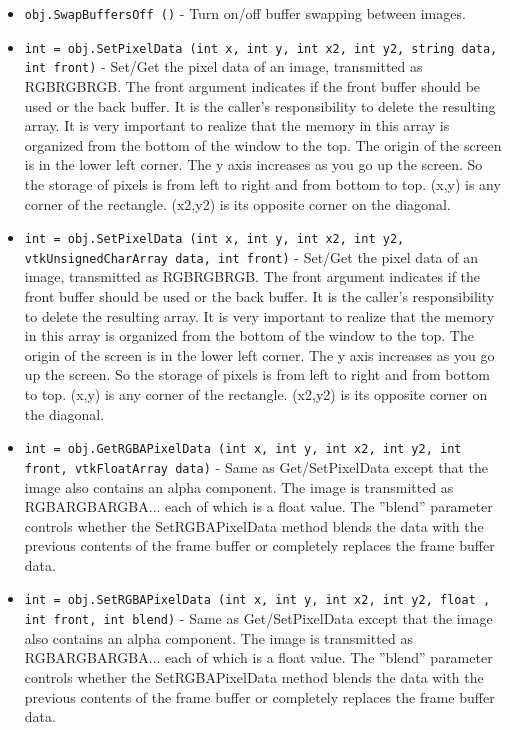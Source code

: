 \begin{itemize}
\item  \verb|obj.SwapBuffersOff ()| -  Turn on/off buffer swapping between images.

\item  \verb|int = obj.SetPixelData (int x, int y, int x2, int y2, string data, int front)| -  Set/Get the pixel data of an image, transmitted as RGBRGBRGB. The
 front argument indicates if the front buffer should be used or the back
 buffer. It is the caller's responsibility to delete the resulting
 array. It is very important to realize that the memory in this array
 is organized from the bottom of the window to the top. The origin
 of the screen is in the lower left corner. The y axis increases as
 you go up the screen. So the storage of pixels is from left to right
 and from bottom to top.
 (x,y) is any corner of the rectangle. (x2,y2) is its opposite corner on
 the diagonal.

\item  \verb|int = obj.SetPixelData (int x, int y, int x2, int y2, vtkUnsignedCharArray data, int front)| -  Set/Get the pixel data of an image, transmitted as RGBRGBRGB. The
 front argument indicates if the front buffer should be used or the back
 buffer. It is the caller's responsibility to delete the resulting
 array. It is very important to realize that the memory in this array
 is organized from the bottom of the window to the top. The origin
 of the screen is in the lower left corner. The y axis increases as
 you go up the screen. So the storage of pixels is from left to right
 and from bottom to top.
 (x,y) is any corner of the rectangle. (x2,y2) is its opposite corner on
 the diagonal.

\item  \verb|int = obj.GetRGBAPixelData (int x, int y, int x2, int y2, int front, vtkFloatArray data)| -  Same as Get/SetPixelData except that the image also contains an alpha
 component. The image is transmitted as RGBARGBARGBA... each of which is a
 float value. The ''blend'' parameter controls whether the SetRGBAPixelData
 method blends the data with the previous contents of the frame buffer
 or completely replaces the frame buffer data.

\item  \verb|int = obj.SetRGBAPixelData (int x, int y, int x2, int y2, float , int front, int blend)| -  Same as Get/SetPixelData except that the image also contains an alpha
 component. The image is transmitted as RGBARGBARGBA... each of which is a
 float value. The ''blend'' parameter controls whether the SetRGBAPixelData
 method blends the data with the previous contents of the frame buffer
 or completely replaces the frame buffer data.


\end{itemize}
